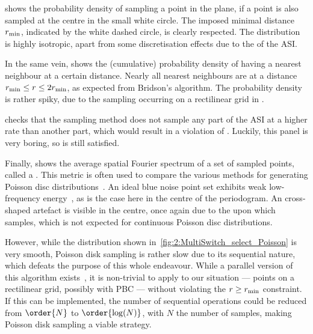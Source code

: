  shows the probability density of sampling a point in the plane, if a point is also sampled at the centre in the small white circle.
The imposed minimal distance $r_\mathrm{min}$, indicated by the white dashed circle, is clearly respected.
The distribution is highly isotropic, apart from some discretisation effects due to the  of the ASI. \par
In the same vein,  shows the (cumulative) probability density of having a nearest neighbour at a certain distance.
Nearly all nearest neighbours are at a distance $r_\mathrm{min} \leq r \leq 2r_\mathrm{min}$, as expected from Bridson's algorithm.
The probability density is rather spiky, due to the sampling occurring on a rectilinear grid in \hotspice. \par
{} checks that the sampling method does not sample any part of the ASI at a higher rate than another part, which would result in a violation of .
Luckily, this panel is very boring, so  is still satisfied. \par
Finally,  shows the average spatial Fourier spectrum of a set of sampled points, called a .
This metric is often used to compare the various methods for generating Poisson disc distributions~\cite{PoissonDiskComparison}.
An ideal blue noise point set exhibits weak low-frequency energy~\cite{EfficientBlueNoisePointSets}, as is the case here in the centre of the periodogram.
An cross-shaped artefact is visible in the centre, once again due to the  upon which \hotspice samples, which is not expected for continuous Poisson disc distributions. \\\par

However, while the distribution shown in~\cref{fig:2:MultiSwitch_select_Poisson} is very smooth, Poisson disk sampling is rather slow due to its sequential nature, which defeats the purpose of this whole  endeavour.
While a parallel version of this algorithm exists~\cite{PoissonDiskParallel}, it is non-trivial to apply to our situation --- points on a rectilinear grid, possibly with PBC --- without violating the $r \geq r_\mathrm{min}$ constraint. %
If this can be implemented, the number of sequential operations could be reduced from $\order{N}$ to $\order{\log(N)}$, with $N$ the number of samples, making Poisson disk sampling a viable strategy.

